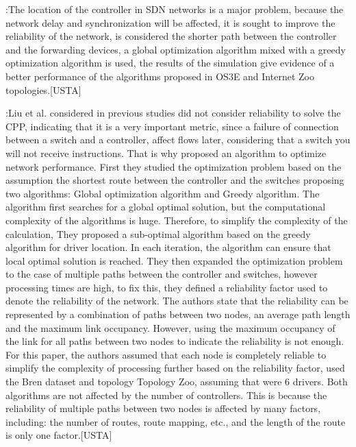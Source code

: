 \documentclass[a4paper,10pt]{article}
\begin{document}
\cite{LiLi16}:The location of the controller in SDN networks is a major problem, because the network delay and synchronization will be affected, it is sought to improve the reliability of the network, is considered the shorter path between the controller and the forwarding devices,  a global optimization algorithm mixed with a greedy optimization algorithm is used, the results of the simulation give evidence of a better performance of the algorithms proposed in OS3E and Internet Zoo topologies.[USTA]

\cite{LiLi16}:Liu et al. considered in previous studies did not consider reliability to solve the CPP, indicating that it is a very important metric, since a failure of connection between a switch and a controller, affect flows later, considering that a switch you will not receive instructions. That is why proposed an algorithm to optimize network performance. First they studied the optimization problem based on the assumption the shortest route between the controller and the switches proposing two algorithms: Global optimization algorithm and Greedy algorithm. The algorithm first searches for a global optimal solution, but the computational complexity of the algorithms is huge. Therefore, to simplify the complexity of the calculation, They proposed a sub-optimal algorithm based on the greedy algorithm for driver location. In each iteration, the algorithm can ensure that local optimal solution is reached. They then expanded the optimization problem to the case of multiple paths between the controller and switches, however processing times are high, to fix this, they defined a reliability factor used to denote the reliability of the network. The authors state that the reliability can be represented by a combination of paths between two nodes, an average path length and the maximum link occupancy. However, using the maximum occupancy of the link for all paths between two nodes to indicate the reliability is not enough. For this paper, the authors assumed that each node is completely reliable to simplify the complexity of processing further based on the reliability factor, used the Bren dataset and topology Topology Zoo, assuming that were 6 drivers. Both algorithms are not affected by the number of controllers. This is because the reliability of multiple paths between two nodes is affected by many factors, including: the number of routes, route mapping, etc., and the length of the route is only one factor.[USTA]
\end{document}
